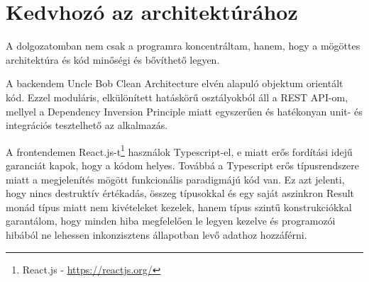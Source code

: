 \section{Kedvhozó az architektúrához}
A dolgozatomban nem csak a programra koncentráltam, hanem, hogy a mögöttes architektúra és kód minőségi és bővíthető legyen.

A backendem Uncle Bob Clean Architecture\cite{cleanArchitecturePost} elvén alapuló objektum orientált kód. Ezzel moduláris, elkülönített hatáskörű osztályokból áll a REST API-om, mellyel a Dependency Inversion Principle miatt egyszerűen és hatékonyan unit- és integrációs tesztelhető az alkalmazás.

A frontendemen React.js-t\footnote{React.js - \href{https://reactjs.org/}{https://reactjs.org/}} használok Typescript-el, e miatt erős fordítási idejű garanciát kapok, hogy a kódom helyes. Továbbá a Typescript erős típusrendszere miatt a megjelenítés mögött funkcionális paradigmájú kód van. Ez azt jelenti, hogy nincs destruktív értékadás, összeg típusokkal és egy saját aszinkron Result monád típus miatt nem kivételeket kezelek, hanem típus szintű konstrukciókkal garantálom, hogy minden hiba megfelelően le legyen kezelve és programozói hibából ne lehessen inkonzisztens állapotban levő adathoz hozzáférni.
